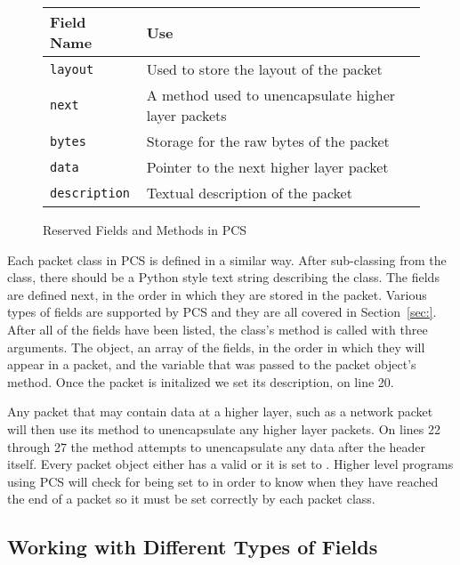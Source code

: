 \documentclass[11pt]{article}
\begin{document}
\begin{figure}
  \centering
\begin{tabular}{|l|l|}
\hline
Field Name & Use \\
\hline
\texttt{layout} & Used to store the layout of the packet\\
\hline
\texttt{next} & A method used to unencapsulate higher layer packets\\
\hline
\texttt{bytes} & Storage for the raw bytes of the packet\\
\hline
\texttt{data} & Pointer to the next higher layer packet\\
\hline
\texttt{description} & Textual description of the packet\\
\hline
\end{tabular}
  \caption{Reserved Fields and Methods in PCS}
  \label{fig:reserved_fields_and_methods}
\end{figure}

Each packet class in PCS is defined in a similar way.  After
sub-classing from the  class, there should be a Python
style text string describing the class.  The fields are defined next,
in the order in which they are stored in the packet.  Various types of
fields are supported by PCS and they are all covered in
Section~\ref{sec:}.  After all of the fields have been listed, the
 class's  method is called with three
arguments.  The  object, an array of the fields, in the
order in which they will appear in a packet, and the 
variable that was passed to the packet object's  method.
Once the packet is initalized we set its description, on line 20.

Any packet that may contain data at a higher layer, such as a network
packet will then use its  method to unencapsulate any
higher layer packets.  On lines 22 through 27 the  method
attempts to unencapsulate any data after the header itself.  Every
packet object either has a valid  or it is set to
.  Higher level programs using PCS will check for
 being set to  in order to know when they
have reached the end of a packet so it must be set correctly by each
packet class.

\subsection{Working with Different Types of Fields}
\label{sec:working_with_different_types_of_fields}
\end{document}
